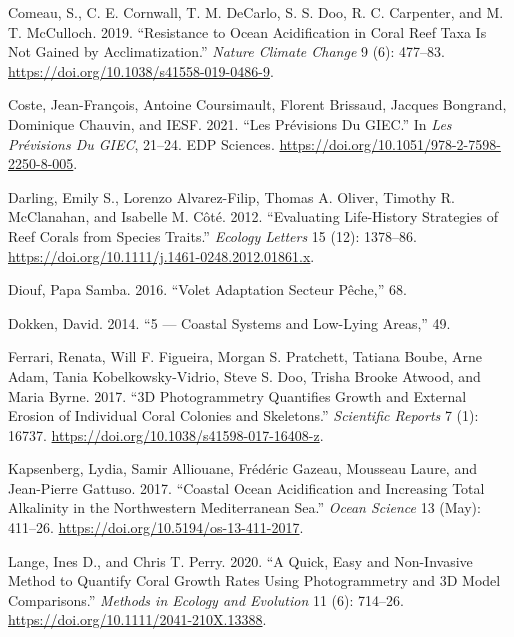 \documentclass[]{article}
\begin{document}
\leavevmode\hypertarget{ref-comeau_resistance_2019}{}%
Comeau, S., C. E. Cornwall, T. M. DeCarlo, S. S. Doo, R. C. Carpenter,
and M. T. McCulloch. 2019. ``Resistance to Ocean Acidification in Coral
Reef Taxa Is Not Gained by Acclimatization.'' \emph{Nature Climate
Change} 9 (6): 477--83. \url{https://doi.org/10.1038/s41558-019-0486-9}.

\leavevmode\hypertarget{ref-coste_les_2021}{}%
Coste, Jean-François, Antoine Coursimault, Florent Brissaud, Jacques
Bongrand, Dominique Chauvin, and IESF. 2021. ``Les Prévisions Du GIEC.''
In \emph{Les Prévisions Du GIEC}, 21--24. EDP Sciences.
\url{https://doi.org/10.1051/978-2-7598-2250-8-005}.

\leavevmode\hypertarget{ref-darling_evaluating_2012}{}%
Darling, Emily S., Lorenzo Alvarez-Filip, Thomas A. Oliver, Timothy R.
McClanahan, and Isabelle M. Côté. 2012. ``Evaluating Life-History
Strategies of Reef Corals from Species Traits.'' \emph{Ecology Letters}
15 (12): 1378--86.
\url{https://doi.org/10.1111/j.1461-0248.2012.01861.x}.

\leavevmode\hypertarget{ref-diouf_volet_2016}{}%
Diouf, Papa Samba. 2016. ``Volet Adaptation Secteur Pêche,'' 68.

\leavevmode\hypertarget{ref-dokken_5_2014}{}%
Dokken, David. 2014. ``5 --- Coastal Systems and Low-Lying Areas,'' 49.

\leavevmode\hypertarget{ref-ferrari_3d_2017}{}%
Ferrari, Renata, Will F. Figueira, Morgan S. Pratchett, Tatiana Boube,
Arne Adam, Tania Kobelkowsky-Vidrio, Steve S. Doo, Trisha Brooke Atwood,
and Maria Byrne. 2017. ``3D Photogrammetry Quantifies Growth and
External Erosion of Individual Coral Colonies and Skeletons.''
\emph{Scientific Reports} 7 (1): 16737.
\url{https://doi.org/10.1038/s41598-017-16408-z}.

\leavevmode\hypertarget{ref-kapsenberg_coastal_2017}{}%
Kapsenberg, Lydia, Samir Alliouane, Frédéric Gazeau, Mousseau Laure, and
Jean-Pierre Gattuso. 2017. ``Coastal Ocean Acidification and Increasing
Total Alkalinity in the Northwestern Mediterranean Sea.'' \emph{Ocean
Science} 13 (May): 411--26.
\url{https://doi.org/10.5194/os-13-411-2017}.

\leavevmode\hypertarget{ref-lange_quick_2020}{}%
Lange, Ines D., and Chris T. Perry. 2020. ``A Quick, Easy and
Non-Invasive Method to Quantify Coral Growth Rates Using Photogrammetry
and 3D Model Comparisons.'' \emph{Methods in Ecology and Evolution} 11
(6): 714--26. \url{https://doi.org/10.1111/2041-210X.13388}.
\end{document}
